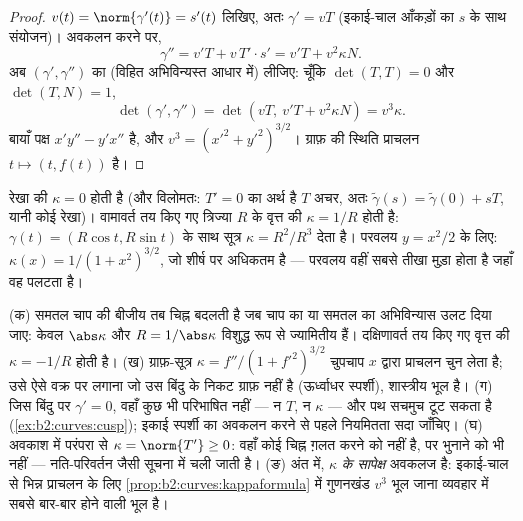 \begin{proof}
$v(t) = \norm{\gamma'(t)} = s'(t)$ लिखिए, अतः $\gamma' = vT$
(इकाई-चाल आँकड़ों का $s$ के साथ संयोजन)। अवकलन करने पर,
\[
\gamma'' = v'T + v\,T'\cdot s' = v'T + v^2\kappa N .
\]
अब $(\gamma', \gamma'')$ का  (विहित अभिविन्यस्त आधार में) लीजिए: चूँकि
$\det(T, T) = 0$ और $\det(T, N) = 1$,
\[
\det(\gamma', \gamma'') = \det(vT,\ v'T + v^2\kappa N)
= v^3\kappa .
\]
बायाँ पक्ष $x'y'' - y'x''$ है, और $v^3 = (x'^2 +
y'^2)^{3/2}$। ग्राफ़ की स्थिति प्राचलन $t \mapsto (t,
f(t))$ है।
\end{proof}

\begin{example}[वृत्त, रेखा, परवलय]\label{ex:b2:curves:kappaexamples}
रेखा की $\kappa = 0$ होती है (और विलोमतः: $T' = 0$ का अर्थ है $T$
अचर, अतः $\tilde\gamma(s) = \tilde\gamma(0) + sT$, यानी कोई रेखा)। वामावर्त तय
किए गए त्रिज्या $R$ के वृत्त की $\kappa = 1/R$ होती है:
$\gamma(t) = (R\cos t, R\sin t)$ के साथ सूत्र $\kappa =
R^2/R^3$ देता है। परवलय $y = x^2/2$ के लिए:
$\kappa(x) = 1/(1 +
x^2)^{3/2}$, जो शीर्ष पर अधिकतम है --- परवलय वहीं सबसे तीखा मुड़ा होता है
जहाँ वह पलटता है।
\end{example}

\begin{remark}[वक्रता के आसपास की सामान्य चूकें]
(क) समतल चाप की बीजीय  तब चिह्न बदलती है जब चाप का या समतल
का अभिविन्यास उलट दिया जाए: केवल
$\abs\kappa$ और $R = 1/\abs\kappa$ विशुद्ध रूप से ज्यामितीय हैं। दक्षिणावर्त
तय किए गए वृत्त की $\kappa = -1/R$ होती है। (ख) ग्राफ़-सूत्र
$\kappa = f''/(1 + f'^2)^{3/2}$ चुपचाप $x$ द्वारा
प्राचलन चुन लेता है; उसे ऐसे वक्र पर लगाना जो उस बिंदु के निकट
ग्राफ़ नहीं है (ऊर्ध्वाधर स्पर्शी), शास्त्रीय भूल है। (ग) जिस बिंदु
पर $\gamma' = 0$, वहाँ कुछ भी परिभाषित नहीं --- न $T$, न
$\kappa$ --- और पथ सचमुच टूट सकता है
(\cref{ex:b2:curves:cusp}); इकाई स्पर्शी का अवकलन करने से पहले
नियमितता सदा जाँचिए। (घ) अवकाश में परंपरा से $\kappa =
\norm{T'} \geq 0$: वहाँ कोई
चिह्न ग़लत करने को नहीं है, पर भुनाने को भी नहीं --- नति-परिवर्तन
जैसी सूचना  में चली जाती है। (ङ) अंत में, $\kappa$
\emph{ के सापेक्ष} अवकलज है: इकाई-चाल से भिन्न प्राचलन के
लिए \cref{prop:b2:curves:kappaformula} में गुणनखंड $v^3$ भूल जाना व्यवहार
में सबसे बार-बार होने वाली भूल है।
\end{remark}

